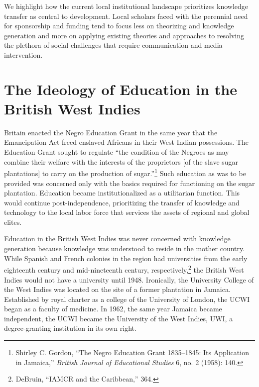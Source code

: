 \documentclass{tufte-handout}
\begin{document}
We highlight how the current local institutional landscape prioritizes
knowledge transfer as central to development. Local scholars faced with
the perennial need for sponsorship and funding tend to focus less on
theorizing and knowledge generation and more on applying existing
theories and approaches to resolving the plethora of social challenges
that require communication and media intervention.

\hypertarget{the-ideology-of-education-in-the-british-west-indies}{%
\section{The Ideology of Education in the British West
Indies}\label{the-ideology-of-education-in-the-british-west-indies}}

Britain enacted the Negro Education Grant in the same year that the
Emancipation Act freed enslaved Africans in their West Indian
possessions. The Education Grant sought to regulate ``the condition of
the Negroes as may combine their welfare with the interests of the
proprietors {[}of the slave sugar plantations{]} to carry on the
production of sugar.''\footnote{Shirley C. Gordon, ``The Negro Education
  Grant 1835--1845: Its Application in Jamaica,'' \emph{British Journal
  of Educational Studies} 6, no. 2 (1958): 140.} Such education as was
to be provided was concerned only with the basics required for
functioning on the sugar plantation. Education became institutionalized
as a utilitarian function. This would continue post-independence,
prioritizing the transfer of knowledge and technology to the local labor
force that services the assets of regional and global elites.

Education in the British West Indies was never concerned with knowledge
generation because knowledge was understood to reside in the mother
country. While Spanish and French colonies in the region had
universities from the early eighteenth century and mid-nineteenth
century, respectively,\footnote{DeBruin, ``IAMCR and the Caribbean,''
  364.} the British West Indies would not have a university until 1948.
Ironically, the University College of the West Indies was located on the
site of a former plantation in Jamaica. Established by royal charter as
a college of the University of London, the UCWI began as a faculty of
medicine. In 1962, the same year Jamaica became independent, the UCWI
became the University of the West Indies, UWI, a degree-granting
institution in its own right.
\end{document}
